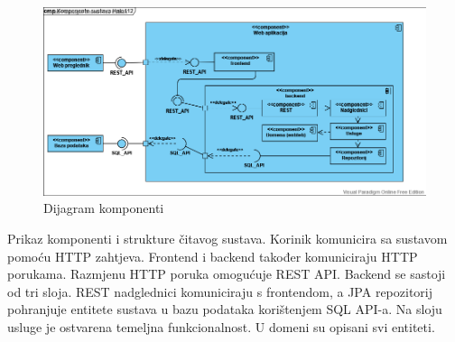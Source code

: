 			\begin{figure}[H]
				\includegraphics[scale=0.5]{slike/cmp.png}
				\centering
				\caption{Dijagram komponenti}
				\label{fig:cmp}
			\end{figure}
			Prikaz komponenti i strukture čitavog sustava. Korinik komunicira sa sustavom pomoću HTTP zahtjeva. Frontend i backend također komuniciraju HTTP porukama. Razmjenu HTTP poruka omogućuje REST API. Backend se sastoji od tri sloja. REST nadglednici komuniciraju s frontendom, a JPA repozitorij pohranjuje entitete sustava u bazu podataka korištenjem SQL API-a. Na sloju usluge je ostvarena temeljna funkcionalnost. U domeni su opisani svi entiteti.
